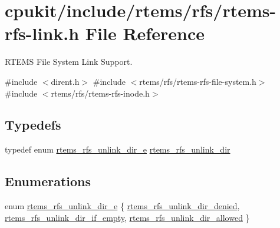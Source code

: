 \hypertarget{rtems-rfs-link_8h}{}\section{cpukit/include/rtems/rfs/rtems-\/rfs-\/link.h File Reference}
\label{rtems-rfs-link_8h}


R\+T\+E\+MS File System Link Support.  


{\ttfamily \#include $<$dirent.\+h$>$}\newline
{\ttfamily \#include $<$rtems/rfs/rtems-\/rfs-\/file-\/system.\+h$>$}\newline
{\ttfamily \#include $<$rtems/rfs/rtems-\/rfs-\/inode.\+h$>$}\newline
\subsection*{Typedefs}
\begin{DoxyCompactItemize}
\item 
typedef enum \mbox{\hyperlink{rtems-rfs-link_8h_a2ba2820fed9440f306c38dbb35c14a29}{rtems\+\_\+rfs\+\_\+unlink\+\_\+dir\+\_\+e}} \mbox{\hyperlink{rtems-rfs-link_8h_aa5069a5066794404a5afb31ac6067cd0}{rtems\+\_\+rfs\+\_\+unlink\+\_\+dir}}
\end{DoxyCompactItemize}
\subsection*{Enumerations}
\begin{DoxyCompactItemize}
\item 
enum \mbox{\hyperlink{rtems-rfs-link_8h_a2ba2820fed9440f306c38dbb35c14a29}{rtems\+\_\+rfs\+\_\+unlink\+\_\+dir\+\_\+e}} \{ \mbox{\hyperlink{rtems-rfs-link_8h_a2ba2820fed9440f306c38dbb35c14a29a47a94ddacd547226c095b31f98863493}{rtems\+\_\+rfs\+\_\+unlink\+\_\+dir\+\_\+denied}}, 
\mbox{\hyperlink{rtems-rfs-link_8h_a2ba2820fed9440f306c38dbb35c14a29a85a813f2d964e8b1c11951e518917962}{rtems\+\_\+rfs\+\_\+unlink\+\_\+dir\+\_\+if\+\_\+empty}}, 
\mbox{\hyperlink{rtems-rfs-link_8h_a2ba2820fed9440f306c38dbb35c14a29af0d29bbe08718a885c872b098384c3dc}{rtems\+\_\+rfs\+\_\+unlink\+\_\+dir\+\_\+allowed}}
 \}
\end{DoxyCompactItemize}
